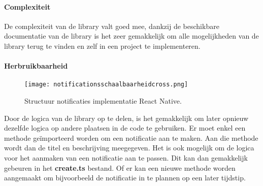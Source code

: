 \paragraph{Complexiteit}
De complexiteit van de library valt goed mee, dankzij de beschikbare documentatie van de library is het zeer 
gemakkelijk om alle mogelijkheden van de library terug te vinden en zelf in een project te implementeren. 

\paragraph{Herbruikbaarheid}
\begin{figure}[H]
    \centering
    \texttt{[image: notificationsschaalbaarheidcross.png]}
    \caption{Structuur notificaties implementatie React Native.}
\end{figure}
Door de logica van de library op te delen, is het gemakkelijk om later opnieuw dezelfde logica op andere plaatsen 
in de code te gebruiken. Er moet enkel een methode geïmporteerd worden om een notificatie aan te maken. Aan die methode 
wordt dan de titel en beschrijving meegegeven. Het is ook mogelijk om de logica voor het aanmaken van een notificatie 
aan te passen. Dit kan dan gemakkelijk gebeuren in het \textbf{create.ts} bestand. Of er kan een nieuwe methode worden 
aangemaakt om bijvoorbeeld de notificatie in te plannen op een later tijdstip.